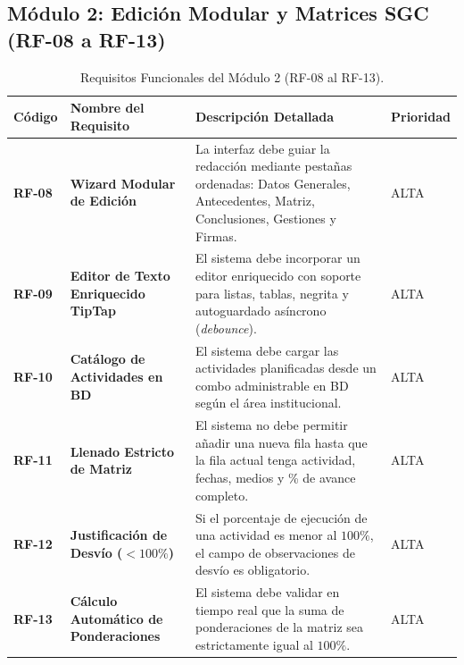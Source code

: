 \documentclass[12pt,a4paper]{article}
\begin{document}
\subsection{Módulo 2: Edición Modular y Matrices SGC (RF-08 a RF-13)}
\begin{table}[htbp]
\centering
\small
\begin{tabularx}{\textwidth}{|>{\hsize=0.35\hsize\bfseries\centering\arraybackslash}X|>{\hsize=0.85\hsize\bfseries}X|>{\hsize=1.5\hsize}X|>{\hsize=0.3\hsize\centering\arraybackslash}X|}
    \hline
    \rowcolor{tableheader}
    Código & Nombre del Requisito & Descripción Detallada & Prioridad \\
    \hline
    RF-08 & Wizard Modular de Edición & La interfaz debe guiar la redacción mediante pestañas ordenadas: Datos Generales, Antecedentes, Matriz, Conclusiones, Gestiones y Firmas. & ALTA \\
    \hline
    RF-09 & Editor de Texto Enriquecido TipTap & El sistema debe incorporar un editor enriquecido con soporte para listas, tablas, negrita y autoguardado asíncrono (\textit{debounce}). & ALTA \\
    \hline
    RF-10 & Catálogo de Actividades en BD & El sistema debe cargar las actividades planificadas desde un combo administrable en BD según el área institucional. & ALTA \\
    \hline
    RF-11 & Llenado Estricto de Matriz & El sistema no debe permitir añadir una nueva fila hasta que la fila actual tenga actividad, fechas, medios y \% de avance completo. & ALTA \\
    \hline
    RF-12 & Justificación de Desvío ($<100\%$) & Si el porcentaje de ejecución de una actividad es menor al $100\%$, el campo de observaciones de desvío es obligatorio. & ALTA \\
    \hline
    RF-13 & Cálculo Automático de Ponderaciones & El sistema debe validar en tiempo real que la suma de ponderaciones de la matriz sea estrictamente igual al $100\%$. & ALTA \\
    \hline
\end{tabularx}
\caption{Requisitos Funcionales del Módulo 2 (RF-08 al RF-13).}
\label{tab:s1_03_rf_m2}
\end{table}
\end{document}
